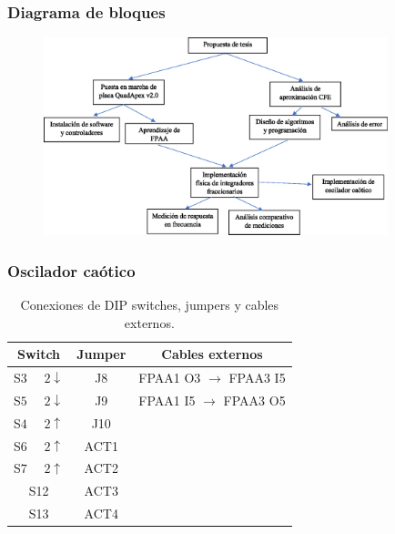 \documentclass[10pt]{beamer}
\begin{document}
	\begin{frame}
		\frametitle{Diagrama de bloques}
		\begin{figure}[hbtp]
			\centering
			\includegraphics[width = 10cm]{diagrama_de_bloques.eps}
		\end{figure}
	\end{frame}

	\begin{frame}
		\frametitle{Oscilador caótico}
		\begin{block}{ }
		\begin{table}[!ht]                                      
		\centering   
		\caption{Conexiones de DIP switches, jumpers y cables externos.}                            
		\label{tab:resumen_de_imp}                                       
			\begin{tabular}{c c c}                        
			\hline                                              
			Switch & Jumper & Cables externos\\            
			\hline       
			{\color{magenta} S$3$ $\quad2\downarrow$}& J8 & FPAA1 O3 $\rightarrow$ FPAA3 I5\\  
			{\color{magenta} S$5$ $\quad2\downarrow$}& J9& FPAA1 I5 $\rightarrow$ FPAA3 O5\\
			{\color{red} S$4$ $\quad2\uparrow$}&J10&\\ 
			{\color{red} S$6$ $\quad2\uparrow$}&ACT1 &\\
			{\color{blue} S$7$ $\quad2\uparrow$}& ACT2 &\\ 
			S12& ACT3 &\\ 
			S13& ACT4 &\\ 
			\hline                                 
			\end{tabular}                                                             
	\end{table}	
		\end{block}
	\end{frame}	
\end{document}
